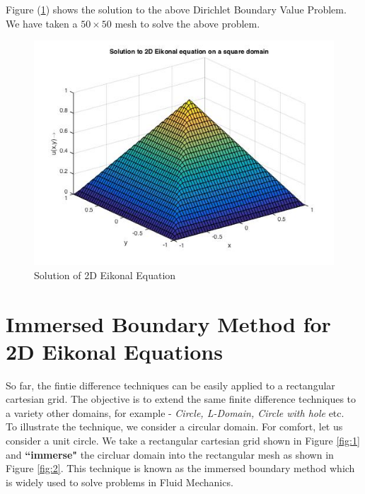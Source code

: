 \noindent
Figure (\ref{fig:8}) shows the solution to the above Dirichlet Boundary Value Problem. We have taken a $50 \times 50$ mesh to solve the above problem.
\begin{figure}[h!]
	\centering
	\includegraphics[scale = 0.5]{Images/2D_eik_square.jpg}
	\caption{Solution of 2D Eikonal Equation}
	\label{fig:8}
\end{figure}

\section{Immersed Boundary Method for 2D Eikonal Equations}
So far, the fintie difference techniques can be easily applied to a rectangular cartesian grid. The objective is to extend the same finite difference techniques to a variety other domains, for example - \textit{Circle, L-Domain, Circle with hole} etc. \\

\noindent
To illustrate the technique, we consider a circular domain. For comfort, let us consider a unit circle. We take a rectangular cartesian grid shown in Figure \ref{fig:1} and \textbf{``immerse"} the circluar domain into the rectangular mesh as shown in Figure \ref{fig:2}. This technique is known as the immersed boundary method \cite{pesk} which is widely used to solve problems in Fluid Mechanics.\\

